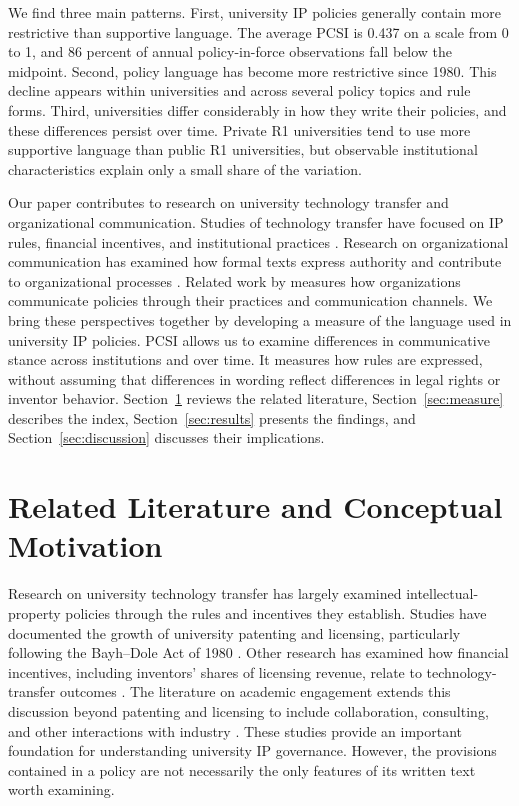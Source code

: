 \documentclass[11pt]{article}
\begin{document}
We find three main patterns. First, university IP policies generally contain more restrictive than supportive language. The average PCSI is 0.437 on a scale from 0 to 1, and 86 percent of annual policy-in-force observations fall below the midpoint. Second, policy language has become more restrictive since 1980. This decline appears within universities and across several policy topics and rule forms. Third, universities differ considerably in how they write their policies, and these differences persist over time. Private R1 universities tend to use more supportive language than public R1 universities, but observable institutional characteristics explain only a small share of the variation.

Our paper contributes to research on university technology transfer and organizational communication. Studies of technology transfer have focused on IP rules, financial incentives, and institutional practices \citep{mowery2001growth,lach2008incentives,jensen2003disclosure,siegel2003assessing}. Research on organizational communication has examined how formal texts express authority and contribute to organizational processes \citep{smith2001texts,cooren2004textual,fairhurst2004organizations}. Related work by \citet{canary2013policy} measures how organizations communicate policies through their practices and communication channels. We bring these perspectives together by developing a measure of the language used in university IP policies. PCSI allows us to examine differences in communicative stance across institutions and over time. It measures how rules are expressed, without assuming that differences in wording reflect differences in legal rights or inventor behavior. Section~\ref{sec:framework} reviews the related literature, Section~\ref{sec:measure} describes the index, Section~\ref{sec:results} presents the findings, and Section~\ref{sec:discussion} discusses their implications.



\section{Related Literature and Conceptual Motivation}\label{sec:framework}

Research on university technology transfer has largely examined intellectual-property policies through the rules and incentives they establish. Studies have documented the growth of university patenting and licensing, particularly following the Bayh--Dole Act of 1980 \citep{mowery2001growth,sampat2006patenting}. Other research has examined how financial incentives, including inventors' shares of licensing revenue, relate to technology-transfer outcomes \citep{lach2008incentives,ouellette2020patent}. The literature on academic engagement extends this discussion beyond patenting and licensing to include collaboration, consulting, and other interactions with industry \citep{perkmann2021academic}. These studies provide an important foundation for understanding university IP governance. However, the provisions contained in a policy are not necessarily the only features of its written text worth examining.
\end{document}
